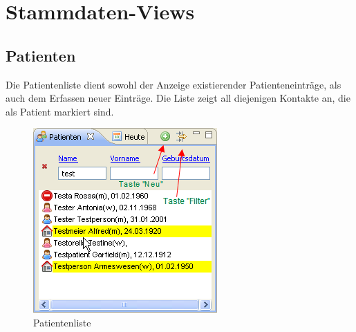 
\section{Stammdaten-Views}

\subsection{Patienten}
Die Patientenliste dient sowohl der Anzeige existierender Patienteneinträge, als
auch dem Erfassen neuer Einträge. Die Liste zeigt all diejenigen Kontakte an,
die als Patient markiert sind.
\begin{figure}[ht]
	\includegraphics{images/patlistview}
	\caption{Patientenliste}
	\label{fig:patlist}
\end{figure}

